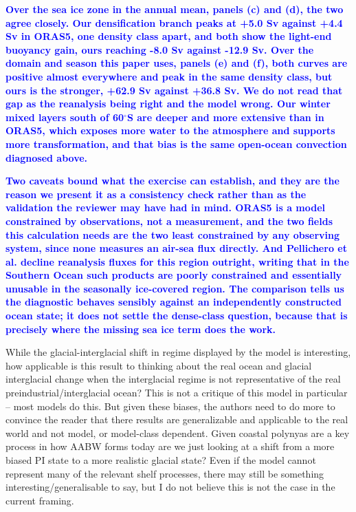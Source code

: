 \documentclass[pdflatex,sn-nature]{sn-jnl}
\begin{document}
\noindent\textcolor{blue}{\textbf{Over the sea ice zone in the annual mean, panels (c) and (d), the two agree closely. Our densification branch peaks at +5.0 Sv against +4.4 Sv in ORAS5, one density class apart, and both show the light-end buoyancy gain, ours reaching -8.0 Sv against -12.9 Sv. Over the domain and season this paper uses, panels (e) and (f), both curves are positive almost everywhere and peak in the same density class, but ours is the stronger, +62.9 Sv against +36.8 Sv. We do not read that gap as the reanalysis being right and the model wrong. Our winter mixed layers south of 60$^\circ$S are deeper and more extensive than in ORAS5, which exposes more water to the atmosphere and supports more transformation, and that bias is the same open-ocean convection diagnosed above.}}


\noindent\textcolor{blue}{\textbf{Two caveats bound what the exercise can establish, and they are the reason we present it as a consistency check rather than as the validation the reviewer may have had in mind. ORAS5 is a model constrained by observations, not a measurement, and the two fields this calculation needs are the two least constrained by any observing system, since none measures an air-sea flux directly. And Pellichero et al. decline reanalysis fluxes for this region outright, writing that in the Southern Ocean such products are poorly constrained and essentially unusable in the seasonally ice-covered region. The comparison tells us the diagnostic behaves sensibly against an independently constructed ocean state; it does not settle the dense-class question, because that is precisely where the missing sea ice term does the work.}}


\medskip
\noindent While the glacial-interglacial shift in regime displayed by the model is interesting, how applicable is this result to thinking about the real ocean and glacial interglacial change when the interglacial regime is not representative of the real preindustrial/interglacial ocean? This is not a critique of this model in particular -- most models do this. But given these biases, the authors need to do more to convince the reader that there results are generalizable and applicable to the real world and not model, or model-class dependent. Given coastal polynyas are a key process in how AABW forms today are we just looking at a shift from a more biased PI state to a more realistic glacial state? Even if the model cannot represent many of the relevant shelf processes, there may still be something interesting/generalisable to say, but I do not believe this is not the case in the current framing.
\medskip
\end{document}
